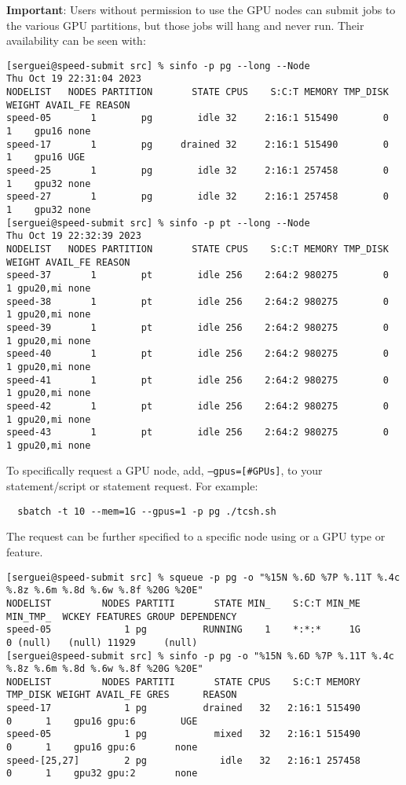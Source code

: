 \noindent \textbf{Important}:
Users without permission to use the GPU nodes can submit jobs to the various GPU
partitions, but those jobs will hang and never run.
Their availability can be seen with:
%
\scriptsize
\begin{verbatim}
[serguei@speed-submit src] % sinfo -p pg --long --Node
Thu Oct 19 22:31:04 2023
NODELIST   NODES PARTITION       STATE CPUS    S:C:T MEMORY TMP_DISK WEIGHT AVAIL_FE REASON
speed-05       1        pg        idle 32     2:16:1 515490        0      1    gpu16 none
speed-17       1        pg     drained 32     2:16:1 515490        0      1    gpu16 UGE
speed-25       1        pg        idle 32     2:16:1 257458        0      1    gpu32 none
speed-27       1        pg        idle 32     2:16:1 257458        0      1    gpu32 none
[serguei@speed-submit src] % sinfo -p pt --long --Node
Thu Oct 19 22:32:39 2023
NODELIST   NODES PARTITION       STATE CPUS    S:C:T MEMORY TMP_DISK WEIGHT AVAIL_FE REASON
speed-37       1        pt        idle 256    2:64:2 980275        0      1 gpu20,mi none
speed-38       1        pt        idle 256    2:64:2 980275        0      1 gpu20,mi none
speed-39       1        pt        idle 256    2:64:2 980275        0      1 gpu20,mi none
speed-40       1        pt        idle 256    2:64:2 980275        0      1 gpu20,mi none
speed-41       1        pt        idle 256    2:64:2 980275        0      1 gpu20,mi none
speed-42       1        pt        idle 256    2:64:2 980275        0      1 gpu20,mi none
speed-43       1        pt        idle 256    2:64:2 980275        0      1 gpu20,mi none
\end{verbatim}
\normalsize

\noindent
To specifically request a GPU node, add, \texttt{--gpus=[\#GPUs]},
to your  statement/script or  statement request.
For example:
\begin{verbatim}
  sbatch -t 10 --mem=1G --gpus=1 -p pg ./tcsh.sh
\end{verbatim}
The request can be further specified to a specific node using 
or a GPU type or feature.

\scriptsize
\begin{verbatim}
[serguei@speed-submit src] % squeue -p pg -o "%15N %.6D %7P %.11T %.4c %.8z %.6m %.8d %.6w %.8f %20G %20E"
NODELIST         NODES PARTITI       STATE MIN_    S:C:T MIN_ME MIN_TMP_  WCKEY FEATURES GROUP DEPENDENCY
speed-05             1 pg          RUNNING    1    *:*:*     1G        0 (null)   (null) 11929     (null)
[serguei@speed-submit src] % sinfo -p pg -o "%15N %.6D %7P %.11T %.4c %.8z %.6m %.8d %.6w %.8f %20G %20E"
NODELIST         NODES PARTITI       STATE CPUS    S:C:T MEMORY TMP_DISK WEIGHT AVAIL_FE GRES      REASON
speed-17             1 pg          drained   32   2:16:1 515490        0      1    gpu16 gpu:6        UGE
speed-05             1 pg            mixed   32   2:16:1 515490        0      1    gpu16 gpu:6       none
speed-[25,27]        2 pg             idle   32   2:16:1 257458        0      1    gpu32 gpu:2       none
\end{verbatim}
\normalsize

